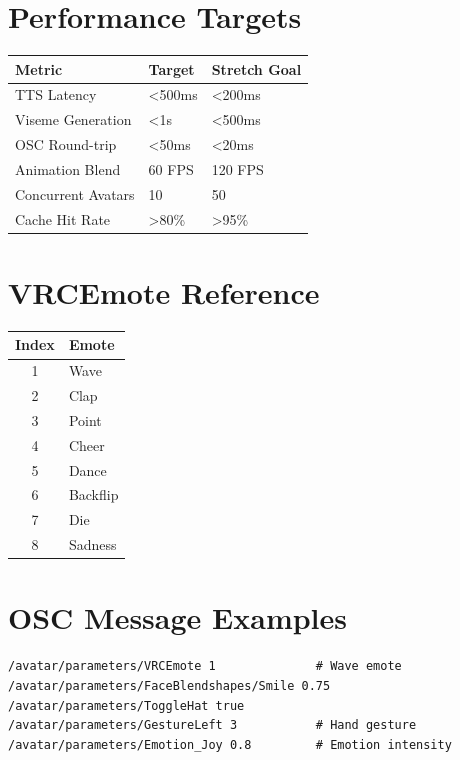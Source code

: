 \documentclass[11pt,letterpaper]{article}
\begin{document}
\newpage
\appendix

\section{Performance Targets}

\begin{center}
\begin{tabular}{lll}
\toprule
\textbf{Metric} & \textbf{Target} & \textbf{Stretch Goal} \\
\midrule
TTS Latency & <500ms & <200ms \\
Viseme Generation & <1s & <500ms \\
OSC Round-trip & <50ms & <20ms \\
Animation Blend & 60 FPS & 120 FPS \\
Concurrent Avatars & 10 & 50 \\
Cache Hit Rate & >80\% & >95\% \\
\bottomrule
\end{tabular}
\end{center}

\section{VRCEmote Reference}

\begin{center}
\begin{tabular}{cl}
\toprule
\textbf{Index} & \textbf{Emote} \\
\midrule
1 & Wave \\
2 & Clap \\
3 & Point \\
4 & Cheer \\
5 & Dance \\
6 & Backflip \\
7 & Die \\
8 & Sadness \\
\bottomrule
\end{tabular}
\end{center}

\section{OSC Message Examples}

\begin{lstlisting}[language={}, caption=Common OSC Messages]
/avatar/parameters/VRCEmote 1              # Wave emote
/avatar/parameters/FaceBlendshapes/Smile 0.75
/avatar/parameters/ToggleHat true
/avatar/parameters/GestureLeft 3           # Hand gesture
/avatar/parameters/Emotion_Joy 0.8         # Emotion intensity
\end{lstlisting}
\end{document}
